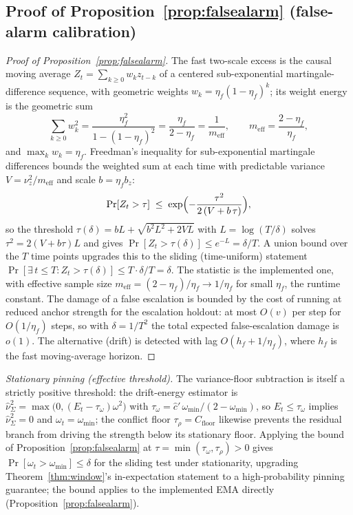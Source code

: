 \subsection{Proof of Proposition~\ref{prop:falsealarm} (false-alarm calibration)}
\label{app:proof-falseesc}



\begin{proof}[Proof of Proposition~\ref{prop:falsealarm}]
The fast two-scale excess is the causal moving average $Z_t = \sum_{k\ge 0} w_k z_{t-k}$ of a centered sub-exponential martingale-difference sequence, with geometric weights $w_k = \eta_f(1-\eta_f)^k$; its weight energy is the geometric sum
\[
\sum_{k\ge 0} w_k^2 = \frac{\eta_f^2}{1-(1-\eta_f)^2} = \frac{\eta_f}{2-\eta_f} = \frac{1}{m_{\mathrm{eff}}},
\qquad m_{\mathrm{eff}} = \frac{2-\eta_f}{\eta_f},
\]
and $\max_k w_k = \eta_f$.
Freedman's inequality for sub-exponential martingale differences \citep{freedman1975} bounds the weighted sum at each time with predictable variance $V = \nu_z^2/m_{\mathrm{eff}}$ and scale $b = \eta_f b_z$:
\[
\Pr[Z_t > \tau] \;\le\; \exp\Bigl(-\frac{\tau^2}{2\,(V + b\,\tau)}\Bigr),
\]
so the threshold $\tau(\delta) = bL + \sqrt{b^2L^2 + 2VL}$ with $L = \log(T/\delta)$ solves $\tau^2 = 2(V + b\tau)L$ and gives $\Pr[Z_t > \tau(\delta)] \le e^{-L} = \delta/T$.
A union bound over the $T$ time points upgrades this to the sliding (time-uniform) statement $\Pr[\exists\, t \le T: Z_t > \tau(\delta)] \le T \cdot \delta/T = \delta$.
The statistic is the implemented one, with effective sample size $m_{\mathrm{eff}} = (2-\eta_f)/\eta_f \to 1/\eta_f$ for small $\eta_f$, the runtime constant.
The damage of a false escalation is bounded by the cost of running at reduced anchor strength for the escalation holdout: at most $O(v)$ per step for $O(1/\eta_f)$ steps, so with $\delta = 1/T^2$ the total expected false-escalation damage is $o(1)$.
The alternative (drift) is detected with lag $O(h_f + 1/\eta_f)$, where $h_f$ is the fast moving-average horizon.
\end{proof}

\medskip
\noindent\emph{Stationary pinning (effective threshold).}
The variance-floor subtraction is itself a strictly positive threshold: the drift-energy estimator is $\widehat\nu^2_\Sigma=\max\bigl(0,(E_t-\tau_\omega)\omega^2\bigr)$ with $\tau_\omega=\hat c'\,\omega_{\min}/(2-\omega_{\min})$, so $E_t\le\tau_\omega$ implies $\widehat\nu^2_\Sigma=0$ and $\omega_t=\omega_{\min}$; the conflict floor $\tau_\rho=C_{\mathrm{floor}}$ likewise prevents the residual branch from driving the strength below its stationary floor.
Applying the bound of Proposition~\ref{prop:falsealarm} at $\tau=\min(\tau_\omega,\tau_\rho)>0$ gives $\Pr[\omega_t>\omega_{\min}]\le\delta$ for the sliding test under stationarity, upgrading Theorem~\ref{thm:window}'s in-expectation statement to a high-probability pinning guarantee; the bound applies to the implemented EMA directly (Proposition~\ref{prop:falsealarm}).

